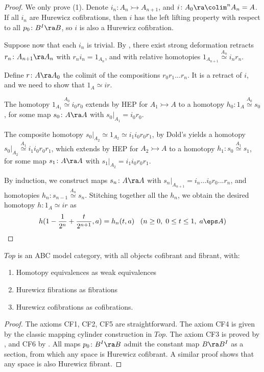 \begin{proof}
We only prove (1). Denote $i_n \colon A_n \rightarrowtail A_{n+1}$, and $i \colon A_0 \ra \colim^n A_n = A$. If all $i_n$ are Hurewicz cofibrations, then $i$ has the left lifting property with respect to all $p_0 \colon B^I \ra B$, so $i$ is also a Hurewicz cofibration.

Suppose now that each $i_n$ is trivial. By , there exist strong deformation retracts $r_n \colon A_{n+1} \ra A_n$ with $r_ni_n = 1_{A_n}$, and with relative homotopies $1_{A_{n+1}} \overset{A_n}{\simeq} i_nr_n$.

Define $r \colon A \ra A_0$ the colimit of the compositions $r_0r_1 ... r_n$. It is a retract of $i$, and we need to show that $1_A \simeq ir$.

The homotopy $1_{A_1} \overset{A_0}{\simeq} i_0r_0$ extends by HEP for $A_1 \rightarrowtail A$ to a homotopy $h_0 \colon 1_{A} \overset{A_0}{\simeq} s_0$, for some map $s_0 \colon A \ra A$ with $s_0 |_{A_1} = i_0r_0$.

The composite homotopy $s_0 |_{A_2} \simeq 1_{A_2} \simeq i_1i_0r_0r_1$, by Dold's  yields a homotopy $s_0 |_{A_2} \overset{A_1}{\simeq} i_1i_0r_0r_1$, which extends by HEP for $A_2 \rightarrowtail A$ to a homotopy $h_1 \colon s_0 \overset{A_1}{\simeq} s_1$, for some map $s_1 \colon A \ra A$ with $s_1 |_{A_2} = i_1i_0r_0r_1$.

By induction, we construct maps $s_n \colon A \ra A$ with $s_n |_{A_{n+1}} = i_n...i_0$$r_0...r_n$, and homotopies $h_n \colon s_{n-1} \overset{A_{n}}{\simeq} s_n$. Stitching together all the $h_n$, we obtain the desired homotopy $h \colon 1_A \simeq ir$ as
\[
h(1 - \frac{1}{2^n} + \frac{t}{2^{n+1}}, a) = h_n(t, a) \;\;\; (n \ge 0, \; 0 \le t \le 1, \; a \eps A)
\]
\end{proof}


\begin{thm}
\label{thm:hurtop}
$Top$ is an ABC model category, with all objects cofibrant and fibrant, with:
\begin{enumerate}
\item
Homotopy equivalences as weak equivalences
\item
Hurewicz fibrations as fibrations
\item
Hurewicz cofibrations as cofibrations.
\end{enumerate}
\end{thm}

\begin{proof}
The axioms CF1, CF2, CF5 are straightforward. The axiom CF4 is given by the classic mapping cylinder construction in $Top$. The axiom CF3 is proved by , and CF6 by . All maps $p_0 \colon B^I \ra B$ admit the constant map $B \ra B^I$ as a section, from which any space is Hurewicz cofibrant. A similar proof shows that any space is also Hurewicz fibrant.
\end{proof}

